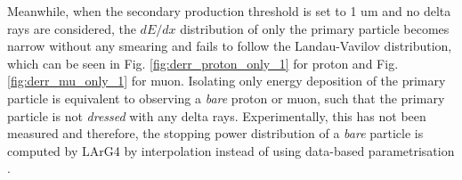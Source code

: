 Meanwhile, when the secondary production threshold is set to 1 um and no delta rays are considered, the $dE/dx$ distribution of only the primary particle becomes narrow without any smearing and fails to follow the Landau-Vavilov distribution, which can be seen in Fig. \ref{fig:derr_proton_only_1} for proton and Fig. \ref{fig:derr_mu_only_1} for muon. 
Isolating only energy deposition of the primary particle is equivalent to observing a \textit{bare} proton or muon, such that the primary particle is not \textit{dressed} with any delta rays.
Experimentally, this has not been measured and therefore, the stopping power distribution of a \textit{bare} particle is computed by LArG4 by interpolation instead of using data-based parametrisation \cite{geant4}.

